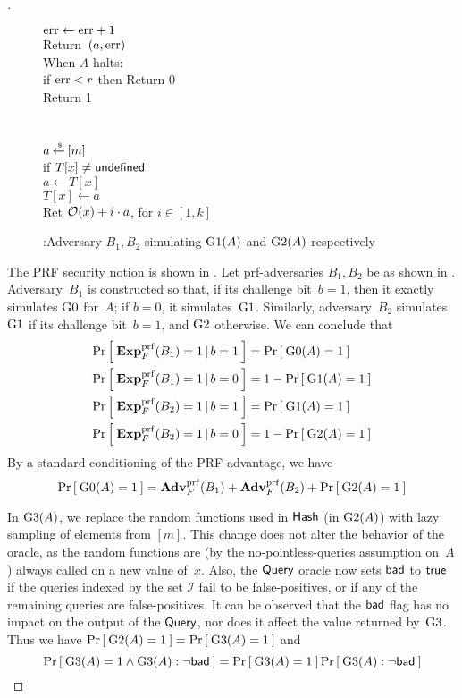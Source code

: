 \begin{proof}[]
\begin{figure}
{{\nudge \nudge $\mathrm{err} \gets\mathrm{err} +1$\\
Return~$(a,\mathrm{err} )$\\
When $A$ halts: \\
\nudge if $\mathrm{err}  < r$ then Return 0\\
\nudge Return 1\\\\
\\
$a {\:\stackrel{{\scriptscriptstyle \hspace{0.2em}\$}} {\leftarrow}\:} [m]$\\
if $T[x] \neq \mathsf{undefined}$\\
\nudge $a \gets T[x]$\\
$T[x] \gets a$\\
Ret  ${\cal O}(x) + i\cdot a$, for $i\in[1,k]$
}
}
\caption{:Adversary $B_1, B_2$ simulating $\text{G1}(A)$ and $\text{G2}(A)$ respectively}\label{fig:BGame1}
\end{figure}

The PRF security notion is shown in . Let
prf-adversaries $B_1, B_2$ be as shown in .
Adversary~$B_1$ is constructed so that, if its challenge bit~$b=1$,
then it exactly simulates $\text{G0}$ for~$A$; if $b=0$, it
simulates~$\text{G1}$.  Similarly, adversary~$B_2$ simulates~$\text{G1}$
if its challenge bit~$b=1$, and $\text{G2}$ otherwise.  We can conclude
that 
\begin{align*}
\Prob{\ExpPRF{F}{B_1} = 1\,|\,b=1} &= \Prob{\game{0}(A)=1} \\%
\Prob{\ExpPRF{F}{B_1} = 1\,|\,b=0} &= 1-\Prob{\game{1}(A)=1} \\%
\Prob{\ExpPRF{F}{B_2} = 1\,|\,b=1} &= \Prob{\game{1}(A)=1} \\%
\Prob{\ExpPRF{F}{B_2} = 1\,|\,b=0} &= 1-\Prob{\game{2}(A)=1} \\%
\end{align*}
%
\noindent
By a standard conditioning of the PRF advantage, we have 
\begin{equation*}
\Prob{\game{0}(A)=1} = \AdvPRF{F}{B_1} +\AdvPRF{F}{B_2} + \Prob{\game{2}(A)=1}%
\end{equation*}


In $\text{G3}(A)$, we replace the random functions used in
$\mathsf{Hash}$ (in $\text{G2}(A)$) with lazy sampling of elements from
$[m]$.  This change does not alter the behavior of the oracle, as the
random functions are (by the no-pointless-queries assumption on~$A$) always called on a new
value of~$x$.
%
Also, the $\mathsf{Query}$ oracle now sets $\mathsf{bad}$ to $\mathsf{true}$ if the
queries indexed by the set $\mathcal{I}$ fail to be false-positives,
or if any of the remaining queries are false-positives. It can be
observed that the $\mathsf{bad}$ flag has no impact on the output of the
$\mathsf{Query}$, nor does it affect  the value returned
by~$\text{G3}$. Thus we have $\Pr\left[\: \text{G2}(A)=1 \:\right] =
\Pr\left[\: \text{G3}(A)=1 \:\right]$ and
\[
\Prob{\game{3}(A)=1 \wedge \game{3}(A): \neg\bad} = \Prob{\game{3}(A)=1} \Prob{\game{3}(A) : \neg\bad}%
\]


\end{proof}
